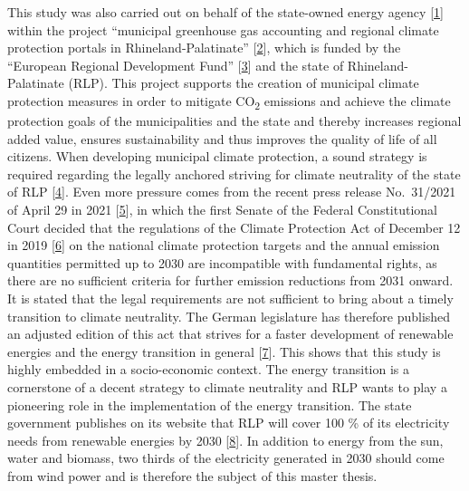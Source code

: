 \documentclass[a4paper,11pt]{article}
\begin{document}
This study was also carried out on behalf of the state-owned energy agency {[}\protect\hyperlink{ref-EnergieagenturRheinlandPfalz.2021}{1}{]} within the project ``municipal greenhouse gas accounting and regional climate protection portals in Rhineland-Palatinate'' {[}\protect\hyperlink{ref-KomBiReK.2021}{2}{]}, which is funded by the ``European Regional Development Fund'' {[}\protect\hyperlink{ref-EuropeanRegionalDevelopmentFund.2021}{3}{]} and the state of Rhineland-Palatinate (RLP). This project supports the creation of municipal climate protection measures in order to mitigate CO\textsubscript{2} emissions and achieve the climate protection goals of the municipalities and the state and thereby increases regional added value, ensures sustainability and thus improves the quality of life of all citizens. When developing municipal climate protection, a sound strategy is required regarding the legally anchored striving for climate neutrality of the state of RLP {[}\protect\hyperlink{ref-RheinlandPfalz.19.08.2014}{4}{]}. Even more pressure comes from the recent press release No.~31/2021 of April 29 in 2021 {[}\protect\hyperlink{ref-Bundesverfassungsgericht.24.03.2021}{5}{]}, in which the first Senate of the Federal Constitutional Court decided that the regulations of the Climate Protection Act of December 12 in 2019 {[}\protect\hyperlink{ref-BundesamtfurJustiz.2019}{6}{]} on the national climate protection targets and the annual emission quantities permitted up to 2030 are incompatible with fundamental rights, as there are no sufficient criteria for further emission reductions from 2031 onward. It is stated that the legal requirements are not sufficient to bring about a timely transition to climate neutrality. The German legislature has therefore published an adjusted edition of this act that strives for a faster development of renewable energies and the energy transition in general {[}\protect\hyperlink{ref-BundesministeriumfurUmweltNaturschutzundnukleareSicherheit.12.05.2021}{7}{]}. This shows that this study is highly embedded in a socio-economic context. The energy transition is a cornerstone of a decent strategy to climate neutrality and RLP wants to play a pioneering role in the implementation of the energy transition. The state government publishes on its website that RLP will cover 100 \% of its electricity needs from renewable energies by 2030 {[}\protect\hyperlink{ref-LandesregierungRheinlandPfalz.2021}{8}{]}. In addition to energy from the sun, water and biomass, two thirds of the electricity generated in 2030 should come from wind power and is therefore the subject of this master thesis.
\end{document}

